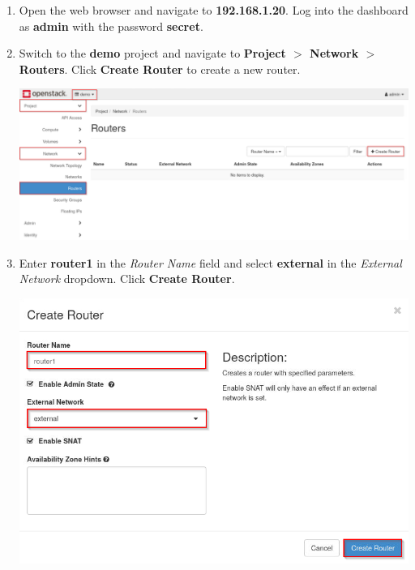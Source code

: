 \documentclass[letterpaper, 12pt]{article}
\begin{document}
\begin{enumerate}
    \item Open the web browser and navigate to \textbf{192.168.1.20}. Log into the dashboard as \textbf{admin} with the
    password \textbf{secret}.

    \item Switch to the \textbf{demo} project and navigate to \textbf{Project $>$ Network $>$ Routers}. Click
    \textbf{Create Router} to create a new router.
    
    \begin{center}
        \includegraphics[width=\linewidth]{images/part2/step2.png}
    \end{center}

    \item Enter \textbf{router1} in the \textit{Router Name} field and select \textbf{external} in the \textit{External
    Network} dropdown. Click \textbf{Create Router}.

    \begin{center}
        \includegraphics[width=\linewidth]{images/part2/step3.png}
    \end{center}


\end{enumerate}
\end{document}

